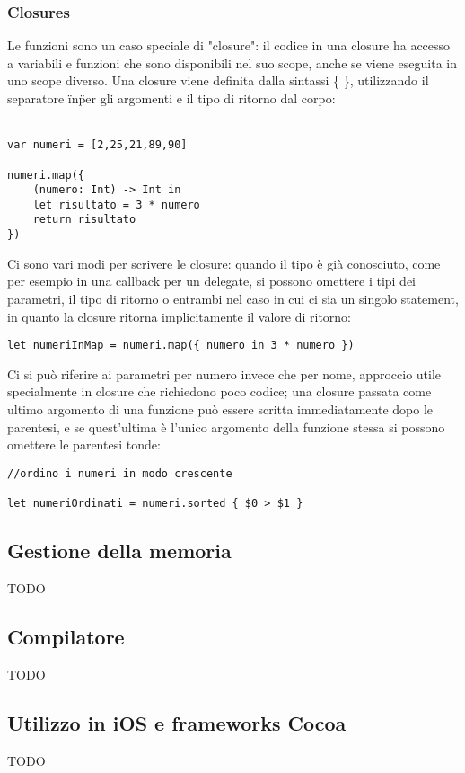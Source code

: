\subsubsection{Closures}
Le funzioni sono un caso speciale di "closure": il codice in una closure ha accesso a variabili e funzioni che sono disponibili nel suo scope, anche se viene eseguita in uno scope diverso. Una closure viene definita dalla sintassi \{ \}, utilizzando il separatore \"in\" per gli argomenti e il tipo di ritorno dal corpo:\\\\ 
\begin{lstlisting}
var numeri = [2,25,21,89,90]

numeri.map({
	(numero: Int) -> Int in 
	let risultato = 3 * numero 
	return risultato 
})
\end{lstlisting}
Ci sono vari modi per scrivere le closure: quando il tipo è già conosciuto, come per esempio in una callback per un delegate, si possono omettere i tipi dei parametri, il tipo di ritorno o entrambi nel caso in cui ci sia un singolo statement, in quanto la closure ritorna implicitamente il valore di ritorno:
\begin{lstlisting}
let numeriInMap = numeri.map({ numero in 3 * numero })
\end{lstlisting}
Ci si può riferire ai parametri per numero invece che per nome, approccio utile specialmente in closure che richiedono poco codice; una closure passata come ultimo argomento di una funzione può essere scritta immediatamente dopo le parentesi, e se quest'ultima è l'unico argomento della funzione stessa si possono omettere le parentesi tonde: 
\begin{lstlisting}
//ordino i numeri in modo crescente

let numeriOrdinati = numeri.sorted { $0 > $1 }
\end{lstlisting}
\subsection{Gestione della memoria}
TODO
\subsection{Compilatore}
TODO
\subsection{Utilizzo in iOS e frameworks Cocoa}
TODO